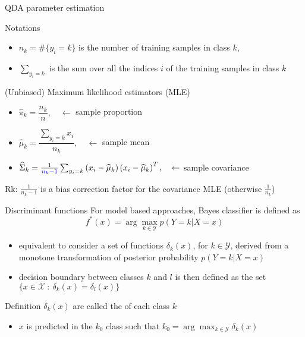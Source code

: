 \begin{frame}{QDA parameter estimation}

\begin{block}{Notations}
   \begin{itemize}
      \item $n_k= \#\{ y_i=k \}$ is the number of training samples in class $k$,
      \item $\sum_{y_i=k}$ is the sum over all the indices $i$ of the training samples in class $k$
   \end{itemize}
\end{block}


\begin{block}{(Unbiased) Maximum likelihood estimators (MLE)}
\begin{itemize}
 \item $\widehat{\pi}_k = \dfrac{n_k}{n},  \quad \leftarrow $ sample proportion
 \item $\widehat{\mu}_k = \dfrac{\sum_{y_i=k} x_i}{n_k}, \quad \leftarrow $ sample mean
 \item $\widehat{\Sigma}_k = \frac{1}{{\textcolor{blue}{n_k-1}}} \sum_{y_i=k} \left(x_i-\widehat{\mu}_k \right) \left(x_i-\widehat{\mu}_k \right)^T,
 \quad \leftarrow $ sample covariance
\end{itemize}
Rk:  $\frac{1}{n_k-1}$ is a bias correction factor for the covariance MLE (otherwise $\frac{1}{n_k}$)
\end{block}


\end{frame}


\begin{frame}{Discriminant functions}
For model based approaches, Bayes classifier is defined as
$$f^{\ast}(x)= \arg \max_{k \in\mathcal{Y}  }p( Y= k | X=x)$$
\begin{itemize}
 \item equivalent to consider a set of functions $\delta_k(x)$, for $k \in\mathcal{Y}$, derived from a monotone transformation of
 posterior probability $p{(Y=k |X=x)}$
 \item decision boundary  between classes $k$ and $l$ is then defined as the set $\{x \in \mathcal{X}\ : \ \delta_k(x)= \delta_l(x) \}$
\end{itemize}

\begin{block}{Definition}
 $\delta_k(x)$ are called the  of each class $k$
 \begin{itemize}
  \item[\doigt] $x$ is predicted in the $k_0$ class such that  $k_0= \arg \max_{k \in\mathcal{Y} } \delta_k(x) $
 \end{itemize}
\end{block}

\end{frame}


